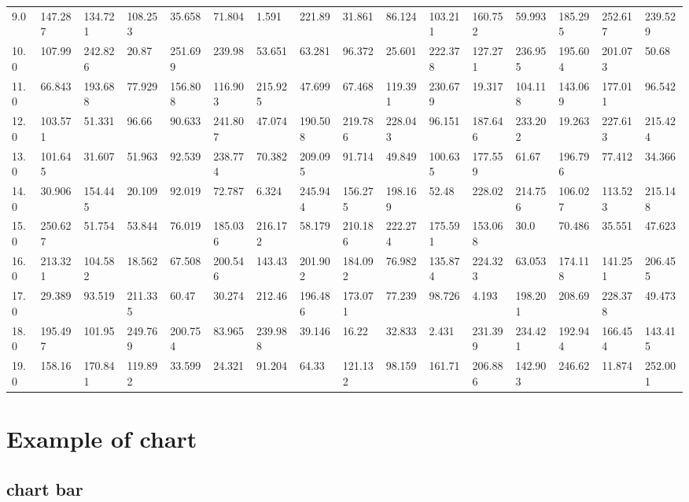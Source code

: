 \documentclass[reprint, floatfix, groupaddress, prb]{article}
\begin{document}
\begin{table}[ht]
{\begin{tabular}[l]{llllllllllllllll}
9.0 & 147.287 & 134.721 & 108.253 & 35.658 & 71.804 & 1.591 & 221.89 & 31.861 & 86.124 & 103.211 & 160.752 & 59.993 & 185.295 & 252.617 & 239.529\\ 
10.0 & 107.99 & 242.826 & 20.87 & 251.699 & 239.98 & 53.651 & 63.281 & 96.372 & 25.601 & 222.378 & 127.271 & 236.955 & 195.604 & 201.073 & 50.68\\ 
11.0 & 66.843 & 193.688 & 77.929 & 156.808 & 116.903 & 215.925 & 47.699 & 67.468 & 119.391 & 230.679 & 19.317 & 104.118 & 143.069 & 177.011 & 96.542\\ 
12.0 & 103.571 & 51.331 & 96.66 & 90.633 & 241.807 & 47.074 & 190.508 & 219.786 & 228.043 & 96.151 & 187.646 & 233.202 & 19.263 & 227.613 & 215.424\\ 
13.0 & 101.645 & 31.607 & 51.963 & 92.539 & 238.774 & 70.382 & 209.095 & 91.714 & 49.849 & 100.635 & 177.559 & 61.67 & 196.796 & 77.412 & 34.366\\ 
14.0 & 30.906 & 154.445 & 20.109 & 92.019 & 72.787 & 6.324 & 245.944 & 156.275 & 198.169 & 52.48 & 228.02 & 214.756 & 106.027 & 113.523 & 215.148\\ 
15.0 & 250.627 & 51.754 & 53.844 & 76.019 & 185.036 & 216.172 & 58.179 & 210.186 & 222.274 & 175.591 & 153.068 & 30.0 & 70.486 & 35.551 & 47.623\\ 
16.0 & 213.321 & 104.582 & 18.562 & 67.508 & 200.546 & 143.43 & 201.902 & 184.092 & 76.982 & 135.874 & 224.323 & 63.053 & 174.118 & 141.251 & 206.455\\ 
17.0 & 29.389 & 93.519 & 211.335 & 60.47 & 30.274 & 212.46 & 196.486 & 173.071 & 77.239 & 98.726 & 4.193 & 198.201 & 208.69 & 228.378 & 49.473\\ 
18.0 & 195.497 & 101.95 & 249.769 & 200.754 & 83.965 & 239.988 & 39.146 & 16.22 & 32.833 & 2.431 & 231.399 & 234.421 & 192.944 & 166.454 & 143.415\\ 
19.0 & 158.16 & 170.841 & 119.892 & 33.599 & 24.321 & 91.204 & 64.33 & 121.132 & 98.159 & 161.71 & 206.886 & 142.903 & 246.62 & 11.874 & 252.001\\ 
\bottomrule 
 \end{tabular}
}\end{table}

    
    

    \hypertarget{example-of-chart}{%
\section{Example of chart}\label{example-of-chart}}

    \hypertarget{chart-bar}{%
\subsection{chart bar}\label{chart-bar}}
\end{document}
